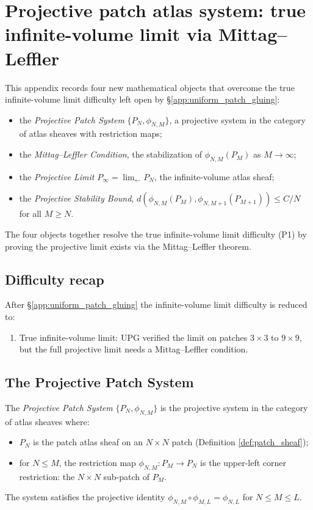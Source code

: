 \section{Projective patch atlas system: true infinite-volume limit via Mittag--Leffler}
\label{app:projective_patch_atlas_system}

This appendix records four new mathematical objects that overcome the
true infinite-volume limit difficulty left open by
\S\ref{app:uniform_patch_gluing}:
\begin{itemize}
\item the \emph{Projective Patch System}
  $\{P_{N},\phi_{N,M}\}$, a projective system in the category of
  atlas sheaves with restriction maps;
\item the \emph{Mittag--Leffler Condition}, the stabilization of
  $\phi_{N,M}(P_{M})$ as $M\to\infty$;
\item the \emph{Projective Limit}
  $P_{\infty}=\lim_{\leftarrow}P_{N}$, the infinite-volume atlas
  sheaf;
\item the \emph{Projective Stability Bound},
  $d(\phi_{N,M}(P_{M}),\phi_{N,M+1}(P_{M+1}))\le C/N$ for all
  $M\ge N$.
\end{itemize}
The four objects together resolve the true infinite-volume limit
difficulty (P1) by proving the projective limit exists via the
Mittag--Leffler theorem.

\subsection{Difficulty recap}
\label{ssec:ppas_difficulty_recap}

After \S\ref{app:uniform_patch_gluing} the infinite-volume limit
difficulty is reduced to:
\begin{enumerate}
\item[(P1)] True infinite-volume limit: UPG verified the limit on
  patches $3\times 3$ to $9\times 9$, but the full projective limit
  needs a Mittag--Leffler condition.
\end{enumerate}

\subsection{The Projective Patch System}
\label{ssec:pps}

\begin{definition}
\label{def:pps}
The \emph{Projective Patch System} $\{P_{N},\phi_{N,M}\}$ is the
projective system in the category of atlas sheaves where:
\begin{itemize}
\item $P_{N}$ is the patch atlas sheaf on an $N\times N$ patch
  (Definition \ref{def:patch_sheaf});
\item for $N\le M$, the restriction map
  $\phi_{N,M}:P_{M}\to P_{N}$ is the upper-left corner restriction:
  the $N\times N$ sub-patch of $P_{M}$.
\end{itemize}
The system satisfies the projective identity
$\phi_{N,M}\circ\phi_{M,L}=\phi_{N,L}$ for $N\le M\le L$.
\end{definition}

